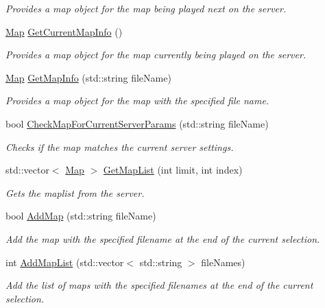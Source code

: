 \begin{DoxyCompactItemize}
\begin{DoxyCompactList}\small\item\em Provides a map object for the map being played next on the server. \end{DoxyCompactList}\item 
\hyperlink{structMap}{Map} \hyperlink{classMethods_a4c8c8afabea84f839091c2a5a79b477d}{Get\-Current\-Map\-Info} ()
\begin{DoxyCompactList}\small\item\em Provides a map object for the map currently being played on the server. \end{DoxyCompactList}\item 
\hyperlink{structMap}{Map} \hyperlink{classMethods_a3a64508bc62765212bcf0d032b4f47ac}{Get\-Map\-Info} (std\-::string file\-Name)
\begin{DoxyCompactList}\small\item\em Provides a map object for the map with the specified file name. \end{DoxyCompactList}\item 
bool \hyperlink{classMethods_a93ac30a58c96f2635fef8f05b27a7864}{Check\-Map\-For\-Current\-Server\-Params} (std\-::string file\-Name)
\begin{DoxyCompactList}\small\item\em Checks if the map matches the current server settings. \end{DoxyCompactList}\item 
std\-::vector$<$ \hyperlink{structMap}{Map} $>$ \hyperlink{classMethods_ad30f67839b950d23c566535f43afefb4}{Get\-Map\-List} (int limit, int index)
\begin{DoxyCompactList}\small\item\em Gets the maplist from the server. \end{DoxyCompactList}\item 
bool \hyperlink{classMethods_aac29fafb7a9f491c64c24a5e24754f71}{Add\-Map} (std\-::string file\-Name)
\begin{DoxyCompactList}\small\item\em Add the map with the specified filename at the end of the current selection. \end{DoxyCompactList}\item 
int \hyperlink{classMethods_a0b136a5a395e4a50c9f667d9fa495b08}{Add\-Map\-List} (std\-::vector$<$ std\-::string $>$ file\-Names)
\begin{DoxyCompactList}\small\item\em Add the list of maps with the specified filenames at the end of the current selection. \end{DoxyCompactList}\item 

\end{DoxyCompactItemize}
